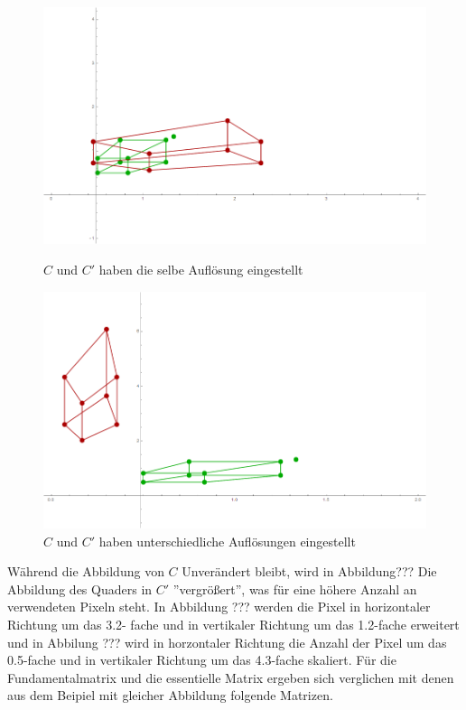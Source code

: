 \begin{figure}[!htb]
	\includegraphics[width=\linewidth]{images/Zeta32_12.png}
	\caption{$C$ und $C'$ haben die selbe Auflösung eingestellt}
	\label{fig:awesome_image1}
	\endminipage\hfill
	\includegraphics[width=\linewidth]{images/Zeta05_43.png}
	\caption{$C$ und $C'$ haben unterschiedliche Auflösungen eingestellt}
	\label{fig:awesome_image2}
	\endminipage\hfill
\end{figure}




Während die Abbildung von $C$ Unverändert bleibt, wird in Abbildung??? Die Abbildung des Quaders in $C'$ ''vergrößert'', was für eine höhere Anzahl an verwendeten Pixeln steht. In Abbildung ??? werden die Pixel in horizontaler Richtung um das 3.2- fache und in vertikaler Richtung um das 1.2-fache erweitert und in Abbilung ??? wird in horzontaler Richtung die Anzahl der Pixel um das 0.5-fache und in vertikaler Richtung um das 4.3-fache skaliert. Für die Fundamentalmatrix und die essentielle Matrix ergeben sich verglichen mit denen aus dem Beipiel mit gleicher Abbildung folgende Matrizen.\\

